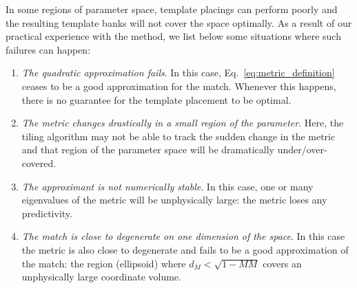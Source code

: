 \documentclass[twocolumn,showpacs,preprintnumbers,nofootinbib,prd,
superscriptaddress,10pt]{revtex4-2}
\begin{document}
In some regions of parameter space, template placings can perform poorly and the resulting template banks will not cover the space optimally.
As a result of our practical experience with the method, we list below some situations where such failures can happen:

\begin{enumerate}
	\item {\it The quadratic approximation fails}. In this case, Eq.~\eqref{eq:metric_definition} ceases to be a good approximation for the match. Whenever this happens, there is no guarantee for the template placement to be optimal.
	\item {\it The metric changes drastically in a small region of the parameter}. Here, the tiling algorithm may not be able to track the sudden change in the metric and that region of the parameter space will be dramatically under/over-covered.
	\item {\it The approximant is not numerically stable}. In this case, one or many eigenvalues of the metric will be unphysically large: the metric loses any predictivity.
	\item {\it The match is close to degenerate on one dimension of the space}. In this case the metric is also close to degenerate and fails to be a good approximation of the match: the region (ellipsoid) where $d_M<\sqrt{1-MM}$ covers an unphysically large coordinate volume.
\end{enumerate}
\end{document}
